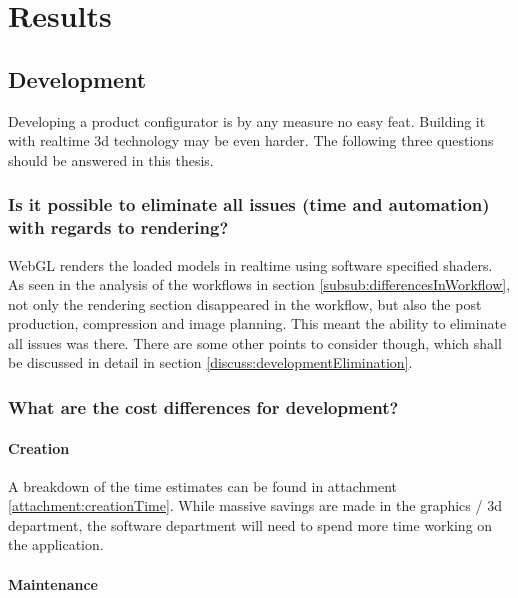     
    
\chapter{Results}

\section{Development}
Developing a product configurator is by any measure no easy feat. Building it with realtime 3d technology may be even harder. The following three questions should be answered in this thesis.

\subsection {Is it possible to eliminate all issues (time and automation) with regards to rendering?}
WebGL renders the loaded models in realtime using software specified shaders. As seen in the analysis of the workflows in section \ref{subsub:differencesInWorkflow}, not only the rendering section disappeared in the workflow, but also the post production, compression and image planning. This meant the ability to eliminate all issues was there. There are some other points to consider though, which shall be discussed in detail in section \ref{discuss:developmentElimination}.

\subsection{What are the cost differences for development?}
\subsubsection{Creation}
A breakdown of the time estimates can be found in attachment \ref{attachment:creationTime}. While massive savings are made in the graphics / 3d department, the software department will need to spend more time working on the application.

\subsubsection{Maintenance}
